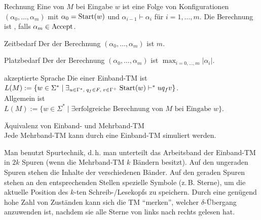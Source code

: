 \begin{Def}{Rechnung}
    Eine  von $M$ bei Eingabe $w$ ist eine Folge von Konfigurationen\\
    $(\alpha_0, \dotsc, \alpha_m)$ mit $\alpha_0 = \text{Start}(w)$ und $\alpha_{i-1} \vdash \alpha_i$
    für $i = 1, \dotsc, m$.
    Die Berechnung ist , falls $\alpha_m \in \text{Accept}$.
\end{Def}

\begin{Def}{Zeitbedarf}
    Der  der Berechnung $(\alpha_0, \dotsc, \alpha_m)$ ist $m$.
\end{Def}

\begin{Def}{Platzbedarf}
    Der  der Berechnung $(\alpha_0, \dotsc, \alpha_m)$ ist
    $\max_{i = 0, \dotsc, m} |\alpha_i|$.
\end{Def}

\begin{Def}{akzeptierte Sprache}
    Die  einer Einband-TM ist\\
    $L(M) := \{w \in \Sigma^\ast \;|\;
    \exists_{u \in \Gamma^\ast,\; q_f \in F,\; v \in \Gamma^+}\;
    \text{Start}(w) \vdash^\ast u q_f v\}$.\\
    Allgemein ist $L(M) := \{w \in \Sigma^\ast \;|\; \exists\text{erfolgreiche Berechnung von } M
    \text{ bei Eingabe } w\}$.
\end{Def}

\linie

\begin{Satz}{Äquivalenz von Einband- und Mehrband-TM}\\
    Jede Mehrband-TM kann durch eine Einband-TM simuliert werden.
\end{Satz}

\begin{Beweis}
    Man benutzt Spurtechnik, d.\,h. man unterteilt das Arbeitsband der Einband-TM
    in $2k$ Spuren (wenn die Mehrband-TM $k$ Bändern besitzt).
    Auf den ungeraden Spuren stehen die Inhalte der verschiedenen Bänder.
    Auf den geraden Spuren stehen an den entsprechenden Stellen spezielle Symbole
    (z.\,B. Sterne), um die aktuelle Position des $k$-ten Schreib-/Lesekopfs zu speichern.
    Durch eine genügend hohe Zahl von Zuständen kann sich die TM "`merken"', welcher
    $\delta$-Übergang anzuwenden ist, nachdem sie alle Sterne von links nach rechts gelesen hat.
\end{Beweis}

